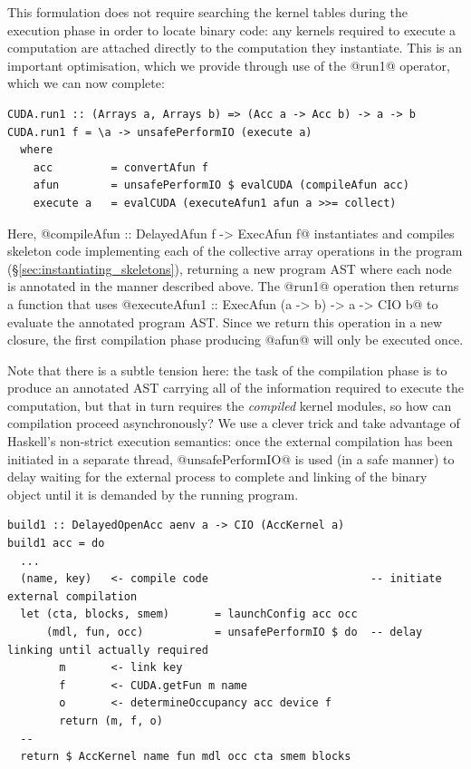 This formulation does not require searching the kernel tables during the
execution phase in order to locate binary code: any kernels required to execute
a computation are attached directly to the computation they instantiate. This is
an important optimisation, which we provide through use of the @run1@
operator, which we can now complete:
%
\begin{lstlisting}[style=haskell]
CUDA.run1 :: (Arrays a, Arrays b) => (Acc a -> Acc b) -> a -> b
CUDA.run1 f = \a -> unsafePerformIO (execute a)
  where
    acc         = convertAfun f
    afun        = unsafePerformIO $ evalCUDA (compileAfun acc)
    execute a   = evalCUDA (executeAfun1 afun a >>= collect)
\end{lstlisting}
%
Here, @compileAfun :: DelayedAfun f -> ExecAfun f@ instantiates and
compiles skeleton code implementing each of the collective array operations in
the program (\S\ref{sec:instantiating_skeletons}), returning a new program AST
where each node is annotated in the manner described above. The @run1@
operation then returns a function that uses
@executeAfun1 :: ExecAfun (a -> b) -> a -> CIO b@
to evaluate the annotated program AST\@. Since we return this operation in a new
closure, the first compilation phase producing @afun@ will only be executed
once.

Note that there is a subtle tension here: the task of the compilation phase is
to produce an annotated AST carrying all of the information required to execute
the computation, but that in turn requires the \emph{compiled} kernel modules,
so how can compilation proceed asynchronously? We use a clever trick and take
advantage of Haskell's non-strict execution semantics: once the external
compilation has been initiated in a separate thread, @unsafePerformIO@ is
used (in a safe manner) to delay waiting for the external process to complete
and linking of the binary object until it is demanded by the running program.
%
\begin{lstlisting}[style=haskell]
build1 :: DelayedOpenAcc aenv a -> CIO (AccKernel a)
build1 acc = do
  ...
  (name, key)   <- compile code                         -- initiate external compilation
  let (cta, blocks, smem)       = launchConfig acc occ
      (mdl, fun, occ)           = unsafePerformIO $ do  -- delay linking until actually required
        m       <- link key
        f       <- CUDA.getFun m name
        o       <- determineOccupancy acc device f
        return (m, f, o)
  --
  return $ AccKernel name fun mdl occ cta smem blocks
\end{lstlisting}


